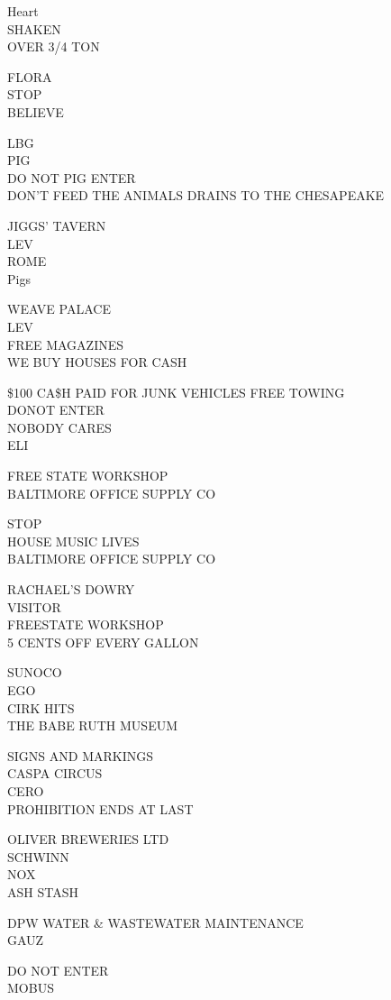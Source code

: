 \documentclass[10pt,letterpaper]{article}
\begin{document}
Heart\\
SHAKEN\\
OVER 3/4 TON

FLORA\\
STOP\\
BELIEVE

LBG\\
PIG\\
DO NOT PIG ENTER\\
DON'T FEED THE ANIMALS DRAINS TO THE CHESAPEAKE

JIGGS' TAVERN\\
LEV\\
ROME\\
Pigs

WEAVE PALACE\\
LEV\\
FREE MAGAZINES\\
WE BUY HOUSES FOR CASH

\$100 CA\$H PAID FOR JUNK VEHICLES FREE TOWING\\
DONOT ENTER\\
NOBODY CARES\\
ELI

FREE STATE WORKSHOP\\
BALTIMORE OFFICE SUPPLY CO

STOP\\
HOUSE MUSIC LIVES\\
BALTIMORE OFFICE SUPPLY CO

RACHAEL'S DOWRY\\
VISITOR\\
FREESTATE WORKSHOP\\
5 CENTS OFF EVERY GALLON

SUNOCO\\
EGO\\
CIRK HITS\\
THE BABE RUTH MUSEUM

SIGNS AND MARKINGS\\
CASPA CIRCUS\\
CERO\\
PROHIBITION ENDS AT LAST

OLIVER BREWERIES LTD\\
SCHWINN\\
NOX\\
ASH STASH

DPW WATER \& WASTEWATER MAINTENANCE\\
GAUZ

DO NOT ENTER\\
MOBUS
\end{document}
